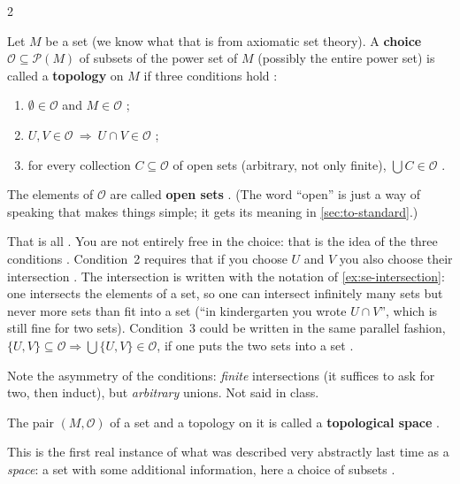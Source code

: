\begin{paracol}{2}
\begin{definition}\label{def:to-topology}
Let $M$ be a set (we know what that is from axiomatic set theory). A \textbf{choice} $\mathcal O\subseteq\mathcal P(M)$
of subsets of the power set of $M$ (possibly the entire power set) is called a \textbf{topology} on $M$ if three
conditions hold :
\begin{enumerate}
  \item $\emptyset\in\mathcal O$ and $M\in\mathcal O$ ;
  \item $U,V\in\mathcal O\ \Rightarrow\ U\cap V\in\mathcal O$ ;
  \item for every collection $C\subseteq\mathcal O$ of open sets (arbitrary, not only finite), $\bigcup C\in\mathcal O$
        .
\end{enumerate}
The elements of $\mathcal O$ are called \textbf{open sets} . (The word ``open'' is just a way of speaking
that makes things simple; it gets its meaning in \cref{sec:to-standard}.)
\end{definition}
That is all . You are not entirely free in the choice: that is the idea of the three conditions
. Condition~2 requires that if you choose $U$ and $V$ you also choose their intersection
. The intersection is written with the notation of \cref{ex:se-intersection}: one intersects the elements
of a set, so one can intersect infinitely many sets but never more sets than fit into a set 
(``in kindergarten you wrote $U\cap V$'', which is still fine for two sets). Condition~3 could be written in the same
parallel fashion, $\{U,V\}\subseteq\mathcal O\Rightarrow\bigcup\{U,V\}\in\mathcal O$, if one puts the two sets
into a set .
\begin{coursenote}
Note the asymmetry of the conditions: \emph{finite} intersections (it suffices to ask for two, then induct), but
\emph{arbitrary} unions. Not said in class.
\end{coursenote}

\begin{definition}\label{def:to-space}
The pair $(M,\mathcal O)$ of a set and a topology on it is called a \textbf{topological space} .
\end{definition}
This is the first real instance of what was described very abstractly last time as a \emph{space}: a set with some
additional information, here a choice of subsets .


\end{paracol}
